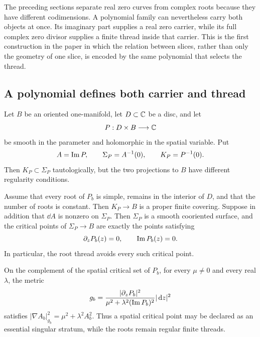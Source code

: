 The preceding sections separate real zero curves from complex roots because they
have different codimensions.  A polynomial family can nevertheless carry both
objects at once.  Its imaginary part supplies a real zero carrier, while its full
complex zero divisor supplies a finite thread inside that carrier.  This is the
first construction in the paper in which the relation between slices, rather
than only the geometry of one slice, is encoded by the same polynomial that
selects the thread.

\subsection{A polynomial defines both carrier and thread}

Let $B$ be an oriented one-manifold, let $D\subset\mathbb{C}$ be a disc, and let
\begin{equation}
 P:D\times B\longrightarrow\mathbb{C}
 \label{eq:polynomial-carrier-field}
\end{equation}
be smooth in the parameter and holomorphic in the spatial variable.  Put
\begin{equation}
 A=\operatorname{Im} P,
 \qquad
 \Sigma_P=A^{-1}(0),
 \qquad
 K_P=P^{-1}(0).
 \label{eq:polynomial-carrier-thread}
\end{equation}
Then $K_P\subset\Sigma_P$ tautologically, but the two projections to $B$ have
different regularity conditions.

\begin{proposition}
\label{prop:polynomial-carrier-thread}
Assume that every root of $P_b$ is simple, remains in the interior of $D$, and
that the number of roots is constant.  Then $K_P\to B$ is a proper finite
covering.  Suppose in addition that $\dd A$ is nonzero on $\Sigma_P$.  Then
$\Sigma_P$ is a smooth cooriented surface, and the critical points of
$\Sigma_P\to B$ are exactly the points satisfying
\begin{equation}
 \partial_zP_b(z)=0,
 \qquad
 \operatorname{Im} P_b(z)=0.
 \label{eq:carrier-critical-value-real}
\end{equation}
In particular, the root thread avoids every such critical point.

On the complement of the spatial critical set of $P_b$, for every $\mu\ne0$
and every real $\lambda$, the metric
\begin{equation}
 g_b=
 \frac{|\partial_zP_b|^2}
      {\mu^2+\lambda^2(\operatorname{Im} P_b)^2}|\,\mathrm{d} z|^2
 \label{eq:polynomial-carrier-aeg-metric}
\end{equation}
satisfies
$|\nabla A_b|_{g_b}^2=\mu^2+\lambda^2A_b^2$.
Thus a spatial critical point may be declared as an essential singular stratum,
while the roots remain regular finite threads.
\end{proposition}

